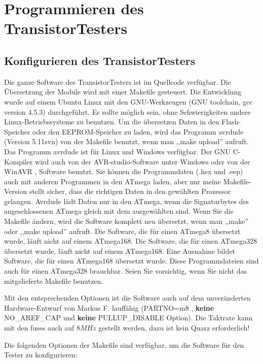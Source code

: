 \chapter{Programmieren des TransistorTesters}

\section{Konfigurieren des TransistorTesters}
\label{sec:config}
Die ganze Software des TransistorTesters ist im Quellcode verfügbar.
Die Übersetzung der Module wird mit einer Makefile gesteuert. Die Entwicklung wurde
auf einem Ubuntu Linux mit den GNU-Werkzeugen (GNU toolchain, gcc version 4.5.3) durchgeführt.
Es sollte möglich sein, ohne Schwierigkeiten andere Linux-Betriebssysteme zu benutzen.
Um die übersetzen Daten in den Flash-Speicher oder den EEPROM-Speicher zu laden, wird das
Programm avrdude \cite{avrdude} (Version 5.11svn) von der Makefile benutzt, wenn man ,,make upload'' aufruft.
Das Programm avrdude ist für Linux und Windows verfügbar.
Der GNU C-Kompiler wird auch von der AVR-studio-Software unter Windows oder von
der WinAVR \cite{winavr1},\cite{winavr2} Software benutzt.
Sie können die Programmdaten (.hex und .eep) auch mit anderen Programmen in den ATmega laden,
aber nur meine Makefile-Version stellt sicher, dass die richtigen Daten in den gewählten Prozessor gelangen.
Avrdude lädt Daten nur in den ATmega, wenn die Signaturbytes des angeschlossenen ATmega gleich mit dem ausgewählten sind.
Wenn Sie die Makefile ändern, wird die Software komplett neu übersetzt, wenn man ,,make'' oder
,,make upload'' aufruft.
Die Software, die für einen ATmega8 übersetzt wurde, läuft nicht auf einem ATmega168.
Die Software, die für einen ATmega328 übersetzt wurde, läuft nicht auf einem ATmega168.
Eine Ausnahme bildet Software, die für einen ATmega168 übersetzt wurde. Diese Programmdateien
sind auch für einen ATmega328 brauchbar.
Seien Sie vorsichtig, wenn Sie nicht das mitgelieferte Makefile benutzen.

Mit den entsprechenden Optionen ist die Software auch auf dem unveränderten Hardware-Entwurf von
Markus F. lauffähig (PARTNO=m8 , {\bf keine} NO\_AREF\_CAP und {\bf keine} PULLUP\_DISABLE Option).
Die Taktrate kann mit den fuses auch auf \(8MHz\) gestellt werden, dazu ist kein Quarz erforderlich!


Die folgenden Optionen der Makefile sind verfügbar, um die Software für den Tester zu konfigurieren:

